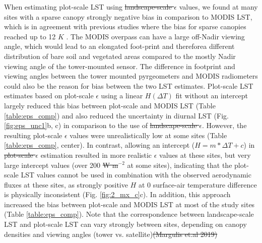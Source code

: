 \documentclass[fleqn,10pt]{wlscirep}
\providecommand{\DIFaddtex}[1]{{\protect\color{blue}\uwave{#1}}} %
\providecommand{\DIFdeltex}[1]{{\protect\color{red}\sout{#1}}}                      %
\providecommand{\DIFaddbegin}{} %
\providecommand{\DIFaddend}{} %
\providecommand{\DIFdelbegin}{} %
\providecommand{\DIFdelend}{} %
\providecommand{\DIFadd}[1]{\texorpdfstring{\DIFaddtex{#1}}{#1}} %
\providecommand{\DIFdel}[1]{\texorpdfstring{\DIFdeltex{#1}}{}} %
\begin{document}
When estimating plot-scale LST using \DIFdelbegin \DIFdel{landscape-scale $\epsilon$ }\DIFdelend \DIFaddbegin \DIFadd{$\epsilon_{MODIS}$ }\DIFaddend values, we found at many sites with a sparse canopy strongly negative bias in comparison to MODIS LST, which is in agreement with previous studies where the bias for sparse canopies reached up to 12 $K$ \cite{guillevic2018land}. The MODIS overpass can have a large off-Nadir viewing angle, which would lead to an elongated foot-print\cite{margulis2019joint} and therefore\DIFaddbegin \DIFadd{, }\DIFaddend a different distribution of bare soil and vegetated areas compared to the mostly Nadir viewing angle of the tower-mounted sensor. The difference in footprint and viewing angles between the tower mounted pyrgeometers and MODIS radiometers could also be the reason for bias between the two LST estimates. Plot-scale LST estimates based on plot-scale $\epsilon$ using a linear $H(\Delta T)$ fit without an intercept largely reduced this bias between plot-scale and MODIS LST (Table \ref{table:eps_comp}) and also reduced the uncertainty in diurnal LST (Fig. \ref{fig:eps_unc1}b, c) in comparison to the use of \DIFdelbegin \DIFdel{landscape-scale $\epsilon$}\DIFdelend \DIFaddbegin \DIFadd{$\epsilon_{MODIS}$}\DIFaddend . However, the resulting plot-scale $\epsilon$ values were unrealistically low at some sites (Table \ref{table:eps_comp}, center). In contrast, allowing an intercept ($H=m*\Delta T + c$) in \DIFdelbegin \DIFdel{plot-scale $\epsilon$ }\DIFdelend \DIFaddbegin \DIFadd{$\epsilon_{plot}$ }\DIFaddend estimation resulted in more realistic $\epsilon$ values at these sites, but very large intercept values (over 200 \DIFdelbegin \DIFdel{W m}\DIFdelend \DIFaddbegin \DIFadd{Wm}\DIFaddend $^{-2}$ at some sites), indicating that the plot-scale LST values cannot be used in combination with the observed aerodynamic fluxes at these sites, as strongly positive $H$ at 0 surface-air temperature difference is physically inconsistent (Fig. \ref{fig:2_mx_c}c). In addition, this approach increased the bias between plot-scale and MODIS LST at most of the study sites (Table \ref{table:eps_comp}). Note that the correspondence between landscape-scale LST and plot-scale LST can vary strongly between sites,  depending on canopy densities and viewing angles (tower vs. satellite)\DIFdelbegin \DIFdel{(Margulis et.al 2019)}\DIFdelend \DIFaddbegin \DIFadd{\mbox{%
\cite{margulis2019joint}}\hspace{0pt}%
}
\end{document}

